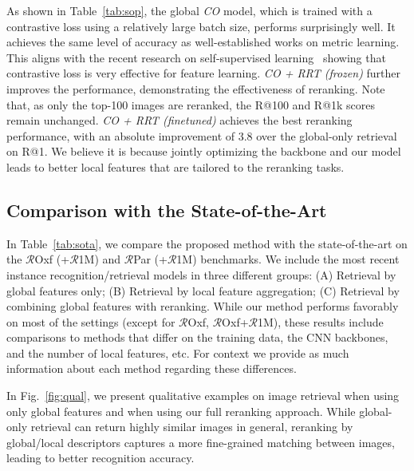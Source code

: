 As shown in Table~\ref{tab:sop}, the global \textit{CO} model, which is trained with a contrastive loss using a relatively large batch size, performs surprisingly well. 
It achieves the same level of accuracy as well-established works on metric learning.
This aligns with the recent research on self-supervised learning~\cite{simclr2020, moco2020} showing that contrastive loss is very effective for feature learning.
\textit{CO + RRT (frozen)} further improves the performance, demonstrating the effectiveness of reranking. 
Note that, as only the top-100 images are reranked, the R@100 and R@1k scores remain unchanged.
\textit{CO + RRT (finetuned)} achieves the best reranking performance, with an absolute improvement of 3.8 over the global-only retrieval on R@1. 
We believe it is because jointly optimizing the backbone and our model leads to better local features that are tailored to the reranking tasks.



\subsection{Comparison with the State-of-the-Art}

In Table~\ref{tab:sota}, we compare the proposed method with the state-of-the-art on the $\mathcal{R}$Oxf (+$\mathcal{R}$1M) and $\mathcal{R}$Par (+$\mathcal{R}$1M) benchmarks. 
We include the most recent instance recognition/retrieval models in three different groups: (A) Retrieval by global features only; (B) Retrieval by local feature aggregation; (C) Retrieval by combining global features with reranking.
While our method performs favorably on most of the settings (except for $\mathcal{R}$Oxf, $\mathcal{R}$Oxf+$\mathcal{R}$1M), these results include comparisons to methods that differ on the training data, the CNN backbones, and the number of local features, etc. For context we provide as much information about each method regarding these differences.


In Fig.~\ref{fig:qual}, we present qualitative examples on image retrieval when using only global features and when using our full reranking approach. While global-only retrieval can return highly similar images in general, reranking by global/local descriptors captures a more fine-grained matching between images, leading to better recognition accuracy.


